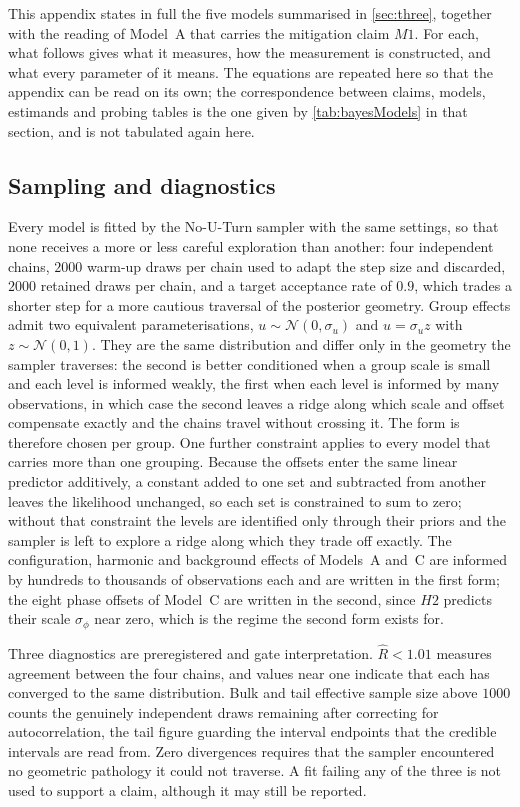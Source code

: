 This appendix states in full the five models summarised in \autoref{sec:three}, together with the reading of Model~A that carries the mitigation claim $M1$. For each, what follows gives what it measures, how the measurement is constructed, and what every parameter of it means. The equations are repeated here so that the appendix can be read on its own; the correspondence between claims, models, estimands and probing tables is the one given by \autoref{tab:bayesModels} in that section, and is not tabulated again here.

\subsection{Sampling and diagnostics}

Every model is fitted by the No-U-Turn sampler with the same settings, so that none receives a more or less careful exploration than another: four independent chains, $2000$ warm-up draws per chain used to adapt the step size and discarded, $2000$ retained draws per chain, and a target acceptance rate of $0.9$, which trades a shorter step for a more cautious traversal of the posterior geometry. Group effects admit two equivalent parameterisations, $u\sim\mathcal N(0,\sigma_u)$ and $u=\sigma_u z$ with $z\sim\mathcal N(0,1)$. They are the same distribution and differ only in the geometry the sampler traverses: the second is better conditioned when a group scale is small and each level is informed weakly, the first when each level is informed by many observations, in which case the second leaves a ridge along which scale and offset compensate exactly and the chains travel without crossing it. The form is therefore chosen per group. One further constraint applies to every model that carries more than one grouping. Because the offsets enter the same linear predictor additively, a constant added to one set and subtracted from another leaves the likelihood unchanged, so each set is constrained to sum to zero; without that constraint the levels are identified only through their priors and the sampler is left to explore a ridge along which they trade off exactly. The configuration, harmonic and background effects of Models~A and~C are informed by hundreds to thousands of observations each and are written in the first form; the eight phase offsets of Model~C are written in the second, since $H2$ predicts their scale $\sigma_\phi$ near zero, which is the regime the second form exists for.

Three diagnostics are preregistered and gate interpretation. $\hat R<1.01$ measures agreement between the four chains, and values near one indicate that each has converged to the same distribution. Bulk and tail effective sample size above $1000$ counts the genuinely independent draws remaining after correcting for autocorrelation, the tail figure guarding the interval endpoints that the credible intervals are read from. Zero divergences requires that the sampler encountered no geometric pathology it could not traverse. A fit failing any of the three is not used to support a claim, although it may still be reported.

